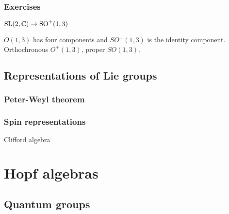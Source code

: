 \documentclass{../../large}
\begin{document}
\section*{Exercises}
\begin{prb}
$\mathrm{SL}(2,\mathbb{C})\to\mathrm{SO}^+(1,3)$
\begin{parts}
\item $O(1,3)$ has four components and $SO^+(1,3)$ is the identity component. Orthochronous $O^+(1,3)$, proper $SO(1,3)$.
\end{parts}
\end{prb}

\chapter{Representations of Lie groups}
\section{Peter-Weyl theorem}
\section{Spin representations}
Clifford algebra






\part{Hopf algebras}
\chapter{}
\chapter{Quantum groups}
\end{document}
